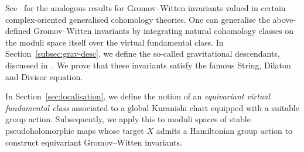\documentclass[AHL,Unicode,longabstracts]{cedram}
\makeatletter
\newcommand{\cl}{\colon}
\newcommand{\Mbar}{\bar{\mathcal M}}
\newcommand{\bQ}{\mathbb{Q}}
\DeclareMathOperator{\pcd}{PD}
\DeclareMathOperator{\Pt}{pt}
\DeclareMathOperator{\GW}{GW}
\renewcommand*{\to}{\mathchoice{\longrightarrow}{\rightarrow}{\rightarrow}{\rightarrow}}
\let\save@mathaccent\mathaccent
\newcommand*\if@single[3]{%
  \setbox0\hbox{${\mathaccent"0362{#1}}^H$}%
  \setbox2\hbox{${\mathaccent"0362{\kern0pt#1}}^H$}%
  \ifdim\ht0=\ht2 #3\else #2\fi
  }
\newcommand*\rel@kern[1]{\kern#1\dimexpr\macc@kerna}
\newcommand*\widebar[1]{\@ifnextchar^{{\wide@bar{#1}{0}}}{\wide@bar{#1}{1}}}
\newcommand*\wide@bar[2]{\if@single{#1}{\wide@bar@{#1}{#2}{1}}{\wide@bar@{#1}{#2}{2}}}
\newcommand*\wide@bar@[3]{%
  \begingroup
  \def\mathaccent##1##2{%
    \let\mathaccent\save@mathaccent
    \if#32 \let\macc@nucleus\first@char \fi
    \setbox\z@\hbox{$\macc@style{\macc@nucleus}_{}$}%
    \setbox\tw@\hbox{$\macc@style{\macc@nucleus}{}_{}$}%
    \dimen@\wd\tw@
    \advance\dimen@-\wd\z@
    \divide\dimen@ 3
    \@tempdima\wd\tw@
    \advance\@tempdima-\scriptspace
    \divide\@tempdima 10
    \advance\dimen@-\@tempdima
    \ifdim\dimen@>\z@ \dimen@0pt\fi
    \rel@kern{0.6}\kern-\dimen@
    \if#31
      \overline{\rel@kern{-0.6}\kern\dimen@\macc@nucleus\rel@kern{0.4}\kern\dimen@}%
      \advance\dimen@0.4\dimexpr\macc@kerna
      \let\final@kern#2%
      \ifdim\dimen@<\z@ \let\final@kern1\fi
      \if\final@kern1 \kern-\dimen@\fi
    \else
      \overline{\rel@kern{-0.6}\kern\dimen@#1}%
    \fi
  }%
  \macc@depth\@ne
  \let\math@bgroup\@empty \let\math@egroup\macc@set@skewchar
  \mathsurround\z@ \frozen@everymath{\mathgroup\macc@group\relax}%
  \macc@set@skewchar\relax
  \let\mathaccentV\macc@nested@a
  \if#31
    \macc@nested@a\relax111{#1}%
  \else
    \def\gobble@till@marker##1\endmarker{}%
    \futurelet\first@char\gobble@till@marker#1\endmarker
    \ifcat\noexpand\first@char A\else
      \def\first@char{}%
    \fi
    \macc@nested@a\relax111{\first@char}%
  \fi
  \endgroup
}
\let\oldbar\bar
\renewcommand*{\bar}[1]{{\mathchoice{\widebar{#1}}{\widebar{#1}}{\widebar{#1}}{\oldbar{#1}}}}
\let\oldin\in
\renewcommand{\in}{\mathchoice{\oldin}{\oldin}{\,\oldin\,}{\,\oldin\,}}
\makeatother
\begin{document}

See~\cite{AMS23} for the analogous results for Gromov--Witten invariants valued in certain complex-oriented generalised cohomology theories. One can generalise the above-defined Gromov--Witten invariants by integrating natural cohomology classes on the moduli space itself over the virtual fundamental class. In Section~\ref{subsec:grav-desc}, we define the so-called gravitational descendants, discussed in~\cite{Giv96,KM98,RT97,Wi91}. We prove that these invariants satisfy the famous String, Dilaton and Divisor equation.

In Section~\ref{sec:localisation}, we define the notion of an \emph{equivariant virtual fundamental class} associated to a global Kuranishi chart equipped with a suitable group action. Subsequently, we apply this to moduli spaces of stable pseudoholomorphic maps whose target $X$ admits a Hamiltonian group action to construct equivariant Gromov--Witten invariants.

\end{document}
